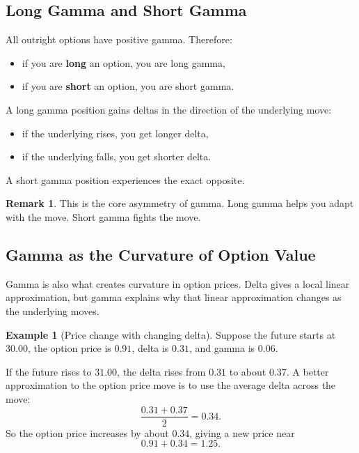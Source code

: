 \documentclass[11pt]{article}
\theoremstyle{definition}
\newtheorem{example}{Example}[section]
\newtheorem{remark}{Remark}[section]
\begin{document}
\subsection{Long Gamma and Short Gamma}

All outright options have positive gamma. Therefore:

\begin{itemize}[leftmargin=2em]
    \item if you are \textbf{long} an option, you are long gamma,
    \item if you are \textbf{short} an option, you are short gamma.
\end{itemize}

A long gamma position gains deltas in the direction of the underlying move:
\begin{itemize}[leftmargin=2em]
    \item if the underlying rises, you get longer delta,
    \item if the underlying falls, you get shorter delta.
\end{itemize}

A short gamma position experiences the exact opposite.

\begin{remark}
This is the core asymmetry of gamma. Long gamma helps you adapt with the move. Short gamma fights the move.
\end{remark}

\subsection{Gamma as the Curvature of Option Value}

Gamma is also what creates curvature in option prices. Delta gives a local linear approximation, but gamma explains why that linear approximation changes as the underlying moves.

\begin{example}[Price change with changing delta]
Suppose the future starts at \(30.00\), the option price is \(0.91\), delta is \(0.31\), and gamma is \(0.06\).

If the future rises to \(31.00\), the delta rises from \(0.31\) to about \(0.37\). A better approximation to the option price move is to use the average delta across the move:
\[
\frac{0.31 + 0.37}{2} = 0.34.
\]
So the option price increases by about \(0.34\), giving a new price near
\[
0.91 + 0.34 = 1.25.
\]
\end{example}
\end{document}
